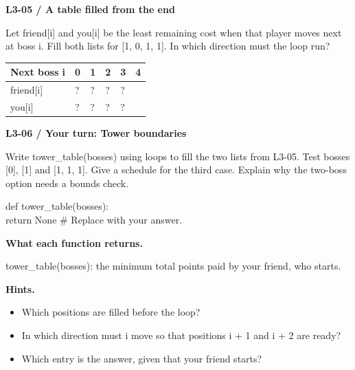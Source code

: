 \documentclass[11pt,a4paper]{article}
\begin{document}
\par\noindent\begin{minipage}{\linewidth}
\textbf{L3-05 / A table filled from the end}\par\smallskip Let friend[i] and you[i] be the least remaining cost when that player moves next at boss i. Fill both lists for [1, 0, 1, 1]. In which direction must the loop run?\par
\par\medskip \begingroup\small\setlength{\tabcolsep}{4pt}\renewcommand{\arraystretch}{1.35}\begin{tabularx}{\linewidth}{>{\raggedright\arraybackslash}X>{\raggedright\arraybackslash}X>{\raggedright\arraybackslash}X>{\raggedright\arraybackslash}X>{\raggedright\arraybackslash}X>{\raggedright\arraybackslash}X}\toprule\textbf{Next boss i} & \textbf{0} & \textbf{1} & \textbf{2} & \textbf{3} & \textbf{4}\\\midrule
friend[i] & ? & ? & ? & ? & 0\\
you[i] & ? & ? & ? & ? & 0\\
\bottomrule\end{tabularx}\endgroup\par\medskip 
\end{minipage}\par\vspace{4mm}
\par\noindent\begin{minipage}{\linewidth}
\textbf{L3-06 / Your turn: Tower boundaries}\par\smallskip Write tower\_table(bosses) using loops to fill the two lists from L3-05. Test bosses [0], [1] and [1, 1, 1]. Give a schedule for the third case. Explain why the two-boss option needs a bounds check.\par
\par{}\par\smallskip\noindent\colorbox{codepaper}{\parbox{\dimexpr\linewidth-2\fboxsep\relax}{\small\ttfamily\raggedright def tower\_table(bosses):\\\hspace*{2.4em}return None  \# Replace with your answer.}}\par
{\small\textbf{What each function returns.}\par tower\_table(bosses): the minimum total points paid by your friend, who starts.\par }
{\small\textbf{Hints.}}\begin{itemize}\item Which positions are filled before the loop?\item In which direction must i move so that positions i + 1 and i + 2 are ready?\item Which entry is the answer, given that your friend starts?\end{itemize}
\end{minipage}\par\vspace{4mm}
\end{document}

